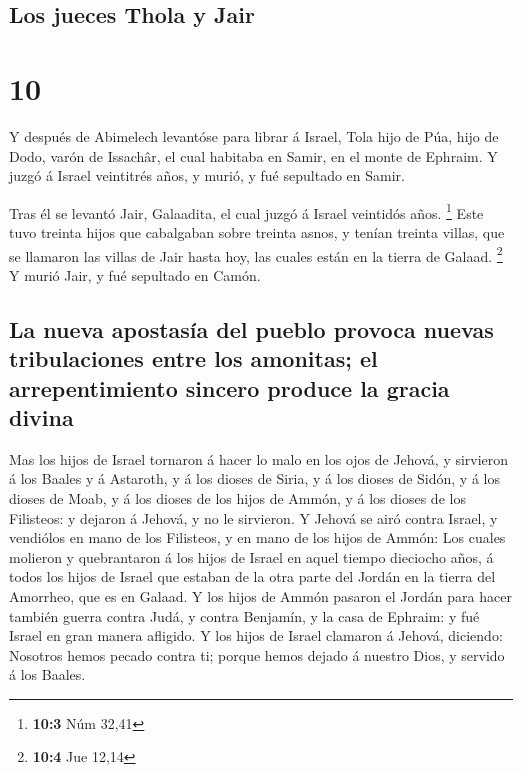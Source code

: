 \hypertarget{los-jueces-thola-y-jair}{%
\subsection{Los jueces Thola y Jair}\label{los-jueces-thola-y-jair}}

\hypertarget{section-9}{%
\section{10}\label{section-9}}

 Y después de Abimelech levantóse para librar á Israel,
Tola hijo de Púa, hijo de Dodo, varón de Issachâr, el cual habitaba en
Samir, en el monte de Ephraim.  Y juzgó á Israel
veintitrés años, y murió, y fué sepultado en Samir.

 Tras él se levantó Jair, Galaadita, el cual juzgó á
Israel veintidós años. \footnote{\textbf{10:3} Núm 32,41} 
Este tuvo treinta hijos que cabalgaban sobre treinta asnos, y tenían
treinta villas, que se llamaron las villas de Jair hasta hoy, las cuales
están en la tierra de Galaad. \footnote{\textbf{10:4} Jue 12,14}
 Y murió Jair, y fué sepultado en Camón.

\hypertarget{la-nueva-apostasuxeda-del-pueblo-provoca-nuevas-tribulaciones-entre-los-amonitas-el-arrepentimiento-sincero-produce-la-gracia-divina}{%
\subsection{La nueva apostasía del pueblo provoca nuevas tribulaciones
entre los amonitas; el arrepentimiento sincero produce la gracia
divina}\label{la-nueva-apostasuxeda-del-pueblo-provoca-nuevas-tribulaciones-entre-los-amonitas-el-arrepentimiento-sincero-produce-la-gracia-divina}}

 Mas los hijos de Israel tornaron á hacer lo malo en los
ojos de Jehová, y sirvieron á los Baales y á Astaroth, y á los dioses de
Siria, y á los dioses de Sidón, y á los dioses de Moab, y á los dioses
de los hijos de Ammón, y á los dioses de los Filisteos: y dejaron á
Jehová, y no le sirvieron.  Y Jehová se airó contra
Israel, y vendiólos en mano de los Filisteos, y en mano de los hijos de
Ammón:  Los cuales molieron y quebrantaron á los hijos de
Israel en aquel tiempo dieciocho años, á todos los hijos de Israel que
estaban de la otra parte del Jordán en la tierra del Amorrheo, que es en
Galaad.  Y los hijos de Ammón pasaron el Jordán para hacer
también guerra contra Judá, y contra Benjamín, y la casa de Ephraim: y
fué Israel en gran manera afligido.  Y los hijos de
Israel clamaron á Jehová, diciendo: Nosotros hemos pecado contra ti;
porque hemos dejado á nuestro Dios, y servido á los Baales.

